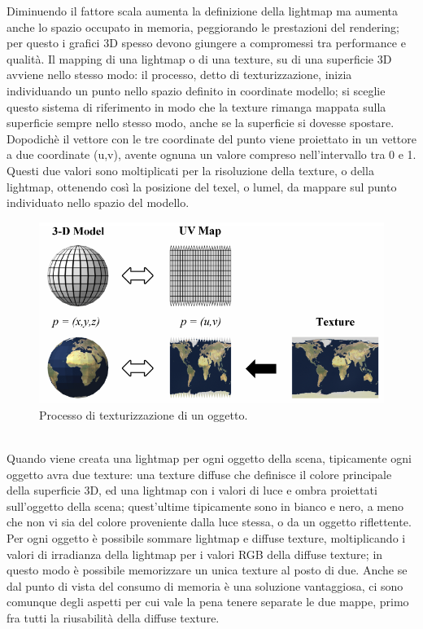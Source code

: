 Diminuendo il fattore scala aumenta la definizione della lightmap ma aumenta anche lo spazio occupato in memoria, peggiorando le prestazioni del rendering; per questo i grafici 3D spesso devono giungere a compromessi tra performance e qualità.
Il mapping di una lightmap o di una texture, su di una superficie 3D avviene nello stesso modo: il processo, detto di texturizzazione, inizia individuando un punto nello spazio definito in coordinate modello; si sceglie questo sistema di riferimento in modo che la texture rimanga mappata sulla superficie sempre nello stesso modo, anche se la superficie si dovesse spostare. \\
Dopodichè il vettore con le tre coordinate del punto viene proiettato in un vettore a due coordinate (u,v), avente ognuna un valore compreso nell’intervallo tra 0 e 1. Questi due valori sono moltiplicati per la risoluzione della texture, o della lightmap, ottenendo così la posizione del texel, o lumel, da mappare sul punto individuato nello spazio del modello.
\\
\begin{figure}[htb]
 \centering
 \includegraphics[width=0.6\linewidth]{images/chapter_stato_arte/stato_arte_uvmap.png}\hfill
 \caption[Texturizzazione mediante mappa UV]{Processo di texturizzazione di un oggetto.}
 \label{fig:stato_arte_uvmap}
\end{figure}
\\
Quando viene creata una lightmap per ogni oggetto della scena, tipicamente ogni oggetto avra due texture: una texture diffuse che definisce il colore principale della superficie 3D, ed una lightmap con i valori di luce e ombra proiettati sull’oggetto della scena; quest’ultime tipicamente sono in bianco e nero, a meno che non vi sia del colore proveniente dalla luce stessa, o da un oggetto riflettente. 
\\
Per ogni oggetto è possibile sommare lightmap e diffuse texture, moltiplicando i valori di irradianza della lightmap per i valori RGB della diffuse texture; in questo modo è possibile memorizzare un unica texture al posto di due. Anche se dal punto di vista del consumo di memoria è una soluzione vantaggiosa, ci sono comunque degli aspetti per cui vale la pena tenere separate le due mappe, primo fra tutti la riusabilità della diffuse texture.
